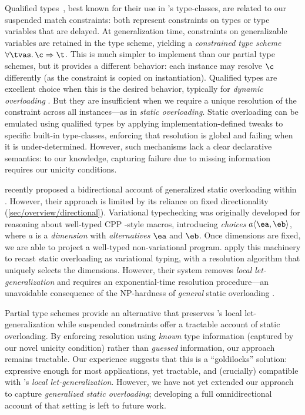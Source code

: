 \documentclass[acmsmall,screen,nonacm%
\Anonymous{,anonymous}{}%
\Final{}{,review}%
]{acmart}
\begin{document}
Qualified types~\citep*{jones-qualified-types}, best known for their use in
\Haskell's type-classes, are related to our suspended match constraints: both
represent constraints on types or type variables that are delayed. At
generalization time, constraints on generalizable variables are retained in the
type scheme, yielding a \emph{constrained type scheme} $\tfor \tvs {\c
\Rightarrow \t}$. This is much simpler to implement than our partial type
schemes, but it provides a different behavior: each instance may resolve $\c$
differently (as the constraint is copied on instantiation).
%
Qualified types are excellent choice when this is the desired behavior,
typically for \emph{dynamic overloading} \citep{conf/popl/WadlerB89}. But they
are insufficient when we require a unique resolution of the constraint across
all instances---as in \emph{static overloading}.
%
Static overloading can be emulated using qualified types by applying
implementation-defined tweaks to specific built-in type-classes, enforcing that
resolution is global and failing when it is under-determined. However, such
mechanisms lack a clear declarative semantics: to our knowledge, capturing
failure due to missing information requires our unicity conditions.

\citet{Leijen-Ye/prefix@pldi2025} recently proposed a bidirectional account of
generalized static overloading within \ML. However, their approach is limited by
its reliance on fixed directionality (\cref{sec/overview/directional}).
%
Variational typechecking \citep{Chen-Erwig-Walkingshaw/variational@toplas2014}
was originally developed for reasoning about well-typed CPP -style
macros, introducing \emph{choices}  $a \angles {\ea, \eb}$, where $a$ is a
\emph{dimension} with \emph{alternatives} $\ea$ and $\eb$. Once dimensions are
fixed, we are able to project a well-typed non-variational program.
\citet{benevs2025simple} apply this machinery to recast static overloading as
variational typing, with a resolution algorithm that uniquely selects the
dimensions.
%
However, their system removes \emph{local let-generalization} and requires an
exponential-time resolution procedure---an unavoidable consequence of the
NP-hardness of \emph{general} static overloading \citep*
{Chargueraud-Bodin-Dunfield-Riboulet/jfla2025}.

Partial type schemes provide an alternative that preserves \ML's local
let-generalization while suspended constraints offer a tractable account of
static overloading. By enforcing resolution using \emph{known} type information
(captured by our novel unicity condition) rather than \emph{guessed}
information, our approach remains tractable. Our experience suggests that this
is a ``goldilocks'' solution: expressive enough for most applications, yet
tractable, and (crucially) compatible with \ML's \emph{local
let-generalization}.
%
However, we have not yet extended our approach to capture \emph{generalized
static overloading}; developing a full omnidirectional account of that setting
is left to future work.
\end{document}
